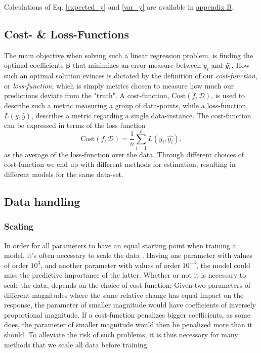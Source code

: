 Calculations of Eq. \ref{expected_y} and \ref{var_y} are available in \hyperref[appendixB]{appendix B}.

\subsection{Cost- \& Loss-Functions}
The main objective when solving such a linear regression problem, is finding the optimal coefficients $\boldsymbol{\beta}$ that minimizes an error measure between $y_i$ and $\Tilde{y_i}$. 
How such an optimal solution evinces is dictated by the definition of our \textit{cost-function},  or \textit{loss-function}, which is simply metrics chosen to measure how much our predictions deviate from the "truth". 
A cost-function, $\text{Cost}(f,\mathcal{D} )$, is used to describe such a metric measuring a group of data-points, while a loss-function, $L(y, \hat{y})$, describes a metric regarding a single data-instance. 
The cost-function can be expressed in terms of the loss function
\begin{equation}
\text{Cost}(f,\mathcal{D}) = \frac{1}{n}\sum_{i=1}^n L(y_i, \hat{y_i}),
\end{equation}
as the average of the loss-function over the data. 
Through different choices of cost-function we end up with different methods for estimation, resulting in different models for the same data-set. 




\subsection{Data handling}

\subsubsection{Scaling}\label{scaling}

In order for all parameters to have an equal starting point when training a model, it's often necessary to scale the data \citep[p. 398]{hastie}. Having one parameter with values of order $10^3$, and another parameter with values of order $10^{-3}$, the model could miss the predictive importance of the latter. Whether or not it is necessary to scale the data, depends on the choice of cost-function; Given two parameters of different magnitudes where the same relative change has equal impact on the response, the parameter of smaller magnitude would have coefficients of inversely proportional magnitude. If a cost-function penalizes bigger coefficients, as some does, the parameter of smaller magnitude would then be penalized more than it should. To alleviate the risk of such problems, it is thus necessary for many methods that we scale all data before training. 

